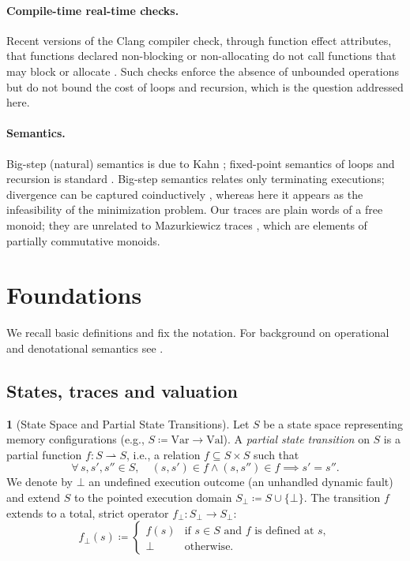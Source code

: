\documentclass[oneside,english]{amsart}
\numberwithin{equation}{section}
\numberwithin{figure}{section}
\theoremstyle{plain}
\theoremstyle{definition}
\newtheorem{defn}[thm]{\protect\definitionname}
\theoremstyle{plain}
\theoremstyle{remark}
\theoremstyle{plain}
\theoremstyle{definition}
\theoremstyle{plain}
\theoremstyle{remark}
\providecommand{\definitionname}{Definition}
\begin{document}
\paragraph{Compile-time real-time checks.}
Recent versions of the Clang compiler check, through function effect attributes, that functions declared non-blocking or
non-allocating do not call functions that may block or allocate \cite{clangeffects}. Such checks enforce the absence of
unbounded operations but do not bound the cost of loops and recursion, which is the question addressed here.

\paragraph{Semantics.}
Big-step (natural) semantics is due to Kahn \cite{kahn1987natural}; fixed-point semantics of loops and recursion is
standard \cite{manna1974mathematical,winskel1993formal}. Big-step semantics relates only terminating executions; divergence
can be captured coinductively \cite{leroy2009coinductive}, whereas here it appears as the infeasibility of the
minimization problem. Our traces are plain words of a free monoid; they are unrelated to Mazurkiewicz traces
\cite{diekert1995traces}, which are elements of partially commutative monoids.

\section{Foundations}
\label{sec:foundations}

We recall basic definitions and fix the notation. For background on operational and
denotational semantics see \cite{winskel1993formal}.

\subsection{States, traces and valuation}

\begin{defn}[State Space and Partial State Transitions]
\label{def:state-transition}
Let $S$ be a state space representing memory configurations (e.g., $S \coloneqq \text{Var} \to \text{Val}$). A \textit{partial state transition} on $S$ is a partial function $f : S \rightharpoonup S$, i.e., a relation $f \subseteq S \times S$ such that
\[
\forall\, s, s', s'' \in S, \quad (s, s') \in f \land (s, s'') \in f \implies s' = s''.
\]
We denote by $\bot$ an undefined execution outcome (an unhandled dynamic fault) and extend $S$ to the pointed execution domain $S_\bot \coloneqq S \cup \{\bot\}$. The transition $f$ extends to a total, strict operator $f_\bot : S_\bot \to S_\bot$:
\[
f_\bot(s) \coloneqq \begin{cases}
f(s) & \text{if } s \in S \text{ and } f \text{ is defined at } s, \\
\bot & \text{otherwise}.
\end{cases}
\]
\end{defn}
\end{document}
